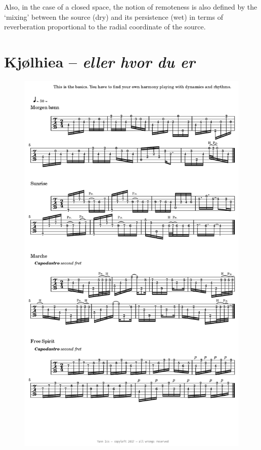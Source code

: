 \documentclass{book}
\begin{document}
\bigskip

Also, in the case of a closed space, the notion of remoteness is also defined
by the `mixing' between the source (dry) and its persistence (wet) in terms of reverberation proportional to the radial coordinate of the source.

\newpage
\section{Kj{\o}lhiea -- \textsl{eller hvor du er}}
\begin{figure}[H]
\begin{center}
\includegraphics[scale=0.31]{img/5572}
\label{kj}
\end{center}
\end{figure}
\end{document}
